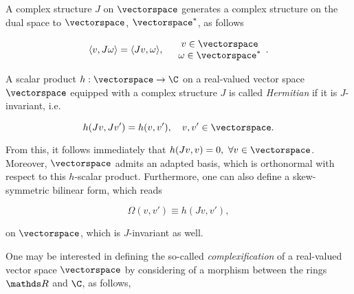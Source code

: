 \documentclass{homework}
\begin{document}
\bigbreak

A complex structure $J$ on $\vectorspace$ generates a complex structure on the dual space to $\vectorspace$, $\vectorspace^{*}$, as follows 

\begin{equation}
    \langle v, J \omega \rangle = \langle Jv, \omega \rangle, \quad \begin{array}{cc}
         v \in \vectorspace \\
         \omega \in \vectorspace^{*}
    \end{array}.
\end{equation}

\begin{df}
    \textnormal{A scalar product $h: \vectorspace \rightarrow \C$ on a real-valued vector space $\vectorspace$ equipped with a complex structure $J$ is called \textit{Hermitian} if it is $J$-invariant, i.e.}

    \begin{equation}
        h(Jv, Jv') = h(v, v'), \quad v,v' \in \vectorspace.
    \end{equation}

\end{df}

\blanky \bigbreak

From this, it follows immediately that $h(Jv, v) = 0, \blanky \forall v \in \vectorspace$. Moreover, $\vectorspace$ admits an adapted basis, which is orthonormal with respect to this $h$-scalar product. Furthermore, one can also define a skew-symmetric bilinear form, which reads

\begin{equation}\label{Complex_Manifolds_skew_symmetric_form}
    \Omega(v,v') \equiv h(Jv, v'),
\end{equation}

on $\vectorspace$, which is $J$-invariant as well. \smallbreak

One may be interested in defining the so-called \textit{complexification} of a real-valued vector space $\vectorspace$ by considering of a morphism between the rings $\R$ and $\C$, as follows,
\end{document}
